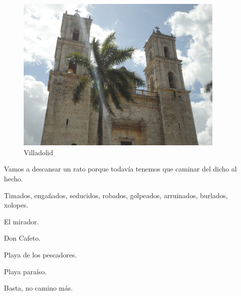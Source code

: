 \documentclass[11pt,twoside,openright,a6paper]{book}
\begin{document}
\begin{figure}[H]
  \centering
    \includegraphics[width=0.9\textwidth]{fotos/2012/villadolid}
  \caption{Villadolid}
  \label{Villadolid}
\end{figure}


\vspace{0.5cm}
\hrulefill\hspace{0.2cm} \decofourleft\decofourright \hspace{0.2cm} \hrulefill
\vspace{0.5cm}

Vamos a descansar un rato porque todavía tenemos que caminar del dicho
al hecho.


\vspace{0.5cm}
\hrulefill\hspace{0.2cm} \decofourleft\decofourright \hspace{0.2cm} \hrulefill
\vspace{0.5cm}

Timados, engañados, seducidos, robados, golpeados, arruinados, burlados, xolopes.


\vspace{0.5cm}
\hrulefill\hspace{0.2cm} \decofourleft\decofourright \hspace{0.2cm} \hrulefill
\vspace{0.5cm}

El mirador.

Don Cafeto.

Playa de los pescadores.

Playa paraíso.

Basta, no camino más.


\vspace{0.5cm}
\hrulefill\hspace{0.2cm} \decofourleft\decofourright \hspace{0.2cm} \hrulefill
\vspace{0.5cm}
\end{document}

